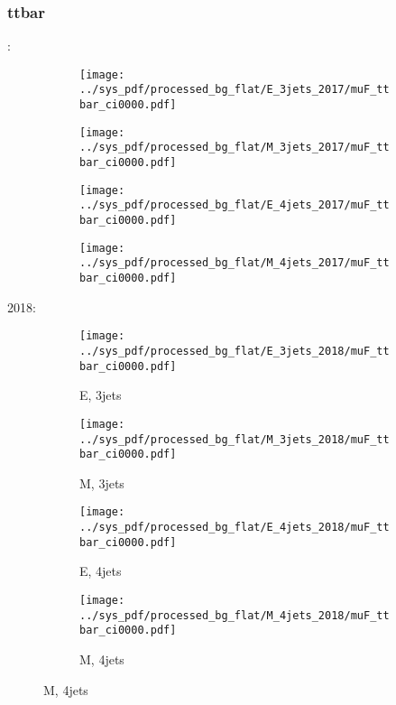 \documentclass{beamer}
\begin{document}
\begin{frame}
\frametitle{ttbar}
\fontsize{5}{1}:
\begin{figure}
\centering
\begin{subfigure}[b]{0.24\textwidth}
\texttt{[image: ../sys\_pdf/processed\_bg\_flat/E\_3jets\_2017/muF\_ttbar\_ci0000.pdf]}
\end{subfigure}
\begin{subfigure}[b]{0.24\textwidth}
\texttt{[image: ../sys\_pdf/processed\_bg\_flat/M\_3jets\_2017/muF\_ttbar\_ci0000.pdf]}
\end{subfigure}
\begin{subfigure}[b]{0.24\textwidth}
\texttt{[image: ../sys\_pdf/processed\_bg\_flat/E\_4jets\_2017/muF\_ttbar\_ci0000.pdf]}
\end{subfigure}
\begin{subfigure}[b]{0.24\textwidth}
\texttt{[image: ../sys\_pdf/processed\_bg\_flat/M\_4jets\_2017/muF\_ttbar\_ci0000.pdf]}
\end{subfigure}
\end{figure}
2018:
\begin{figure}
\centering
\begin{subfigure}[b]{0.24\textwidth}
\texttt{[image: ../sys\_pdf/processed\_bg\_flat/E\_3jets\_2018/muF\_ttbar\_ci0000.pdf]}
\captionsetup{font=tiny}
\caption{E, 3jets}
\end{subfigure}
\begin{subfigure}[b]{0.24\textwidth}
\texttt{[image: ../sys\_pdf/processed\_bg\_flat/M\_3jets\_2018/muF\_ttbar\_ci0000.pdf]}
\captionsetup{font=tiny}
\caption{M, 3jets}
\end{subfigure}
\begin{subfigure}[b]{0.24\textwidth}
\texttt{[image: ../sys\_pdf/processed\_bg\_flat/E\_4jets\_2018/muF\_ttbar\_ci0000.pdf]}
\captionsetup{font=tiny}
\caption{E, 4jets}
\end{subfigure}
\begin{subfigure}[b]{0.24\textwidth}
\texttt{[image: ../sys\_pdf/processed\_bg\_flat/M\_4jets\_2018/muF\_ttbar\_ci0000.pdf]}
\captionsetup{font=tiny}
\caption{M, 4jets}
\end{subfigure}
\end{figure}
\end{frame}
\end{document}
